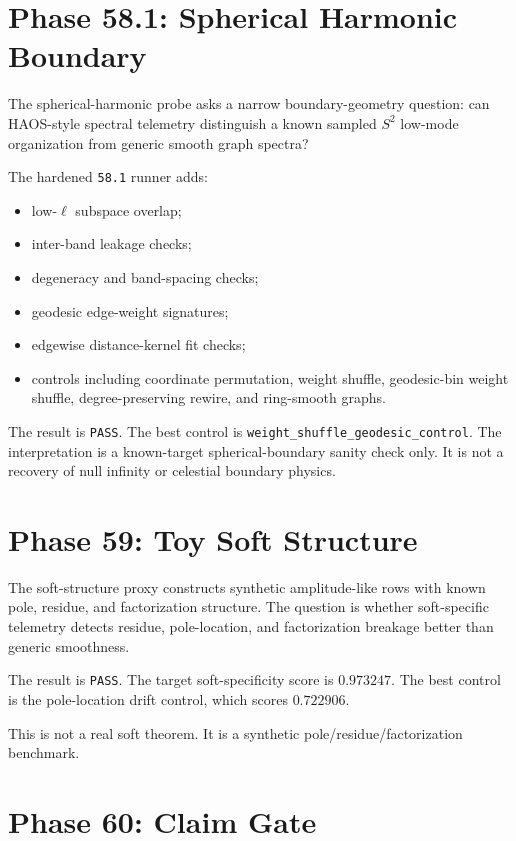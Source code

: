 \documentclass[11pt]{article}
\begin{document}
\section{Phase 58.1: Spherical Harmonic Boundary}

The spherical-harmonic probe asks a narrow boundary-geometry question: can HAOS-style spectral telemetry distinguish a known sampled $S^2$ low-mode organization from generic smooth graph spectra?

The hardened \texttt{58.1} runner adds:
\begin{itemize}
\item low-$\ell$ subspace overlap;
\item inter-band leakage checks;
\item degeneracy and band-spacing checks;
\item geodesic edge-weight signatures;
\item edgewise distance-kernel fit checks;
\item controls including coordinate permutation, weight shuffle, geodesic-bin weight shuffle, degree-preserving rewire, and ring-smooth graphs.
\end{itemize}

The result is \texttt{PASS}. The best control is \texttt{weight\_shuffle\_geodesic\_control}. The interpretation is a known-target spherical-boundary sanity check only. It is not a recovery of null infinity or celestial boundary physics.

\section{Phase 59: Toy Soft Structure}

The soft-structure proxy constructs synthetic amplitude-like rows with known pole, residue, and factorization structure. The question is whether soft-specific telemetry detects residue, pole-location, and factorization breakage better than generic smoothness.

The result is \texttt{PASS}. The target soft-specificity score is $0.973247$. The best control is the pole-location drift control, which scores $0.722906$.

This is not a real soft theorem. It is a synthetic pole/residue/factorization benchmark.

\section{Phase 60: Claim Gate}
\end{document}
